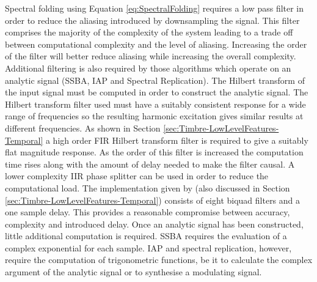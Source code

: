 		Spectral folding using Equation \ref{eq:SpectralFolding} requires a low pass filter in order to reduce the
		aliasing introduced by downsampling the signal. This filter comprises the majority of the complexity of the
		system leading to a trade off between computational complexity and the level of aliasing. Increasing the
		order of the filter will better reduce aliasing while increasing the overall complexity. Additional
		filtering is also required by those algorithms which operate on an analytic signal (SSBA, IAP and Spectral
		Replication). The Hilbert transform of the input signal must be computed in order to construct the analytic
		signal. The Hilbert transform filter used must have a suitably consistent response for a wide range of
		frequencies so the resulting harmonic excitation gives similar results at different frequencies. As shown
		in Section \ref{sec:Timbre-LowLevelFeatures-Temporal} a high order FIR Hilbert transform filter is required
		to give a suitably flat magnitude response. As the order of this filter is increased the computation time
		rises along with the amount of delay needed to make the filter causal. A lower complexity IIR phase
		splitter can be used in order to reduce the computational load. The implementation given by
		\citet{niemitalo2003hilbert} (also discussed in Section \ref{sec:Timbre-LowLevelFeatures-Temporal})
		consists of eight biquad filters and a one sample delay. This provides a reasonable compromise between
		accuracy, complexity and introduced delay.  Once an analytic signal has been constructed, little additional
		computation is required. SSBA requires the evaluation of a complex exponential for each sample. IAP and
		spectral replication, however, require the computation of trigonometric functions, be it to calculate the
		complex argument of the analytic signal or to synthesise a modulating signal.

